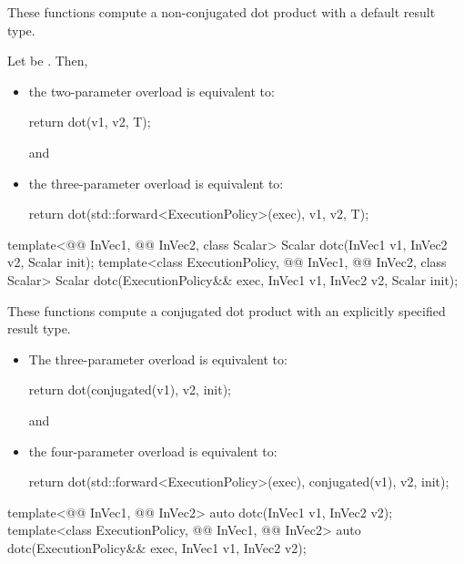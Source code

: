 \begin{itemdescr}
\pnum
These functions compute a non-conjugated dot product with a default result type.

\pnum
\effects
Let  be
.
Then,
\begin{itemize}
\item
the two-parameter overload is equivalent to:
\begin{codeblock}
return dot(v1, v2, T{});
\end{codeblock}
and
\item
the three-parameter overload is equivalent to:
\begin{codeblock}
return dot(std::forward<ExecutionPolicy>(exec), v1, v2, T{});
\end{codeblock}
\end{itemize}
\end{itemdescr}

%
\begin{itemdecl}
template<@@ InVec1, @@ InVec2, class Scalar>
  Scalar dotc(InVec1 v1, InVec2 v2, Scalar init);
template<class ExecutionPolicy, @@ InVec1, @@ InVec2, class Scalar>
  Scalar dotc(ExecutionPolicy&& exec,
              InVec1 v1, InVec2 v2, Scalar init);
\end{itemdecl}

\begin{itemdescr}

\pnum
These functions compute a conjugated dot product
with an explicitly specified result type.

\pnum
\effects
\begin{itemize}
\item
The three-parameter overload is equivalent to:
\begin{codeblock}
return dot(conjugated(v1), v2, init);
\end{codeblock}
and
\item
the four-parameter overload is equivalent to:
\begin{codeblock}
return dot(std::forward<ExecutionPolicy>(exec), conjugated(v1), v2, init);
\end{codeblock}
\end{itemize}
\end{itemdescr}

%
\begin{itemdecl}
template<@@ InVec1, @@ InVec2>
  auto dotc(InVec1 v1, InVec2 v2);
template<class ExecutionPolicy, @@ InVec1, @@ InVec2>
  auto dotc(ExecutionPolicy&& exec,
            InVec1 v1, InVec2 v2);
\end{itemdecl}

